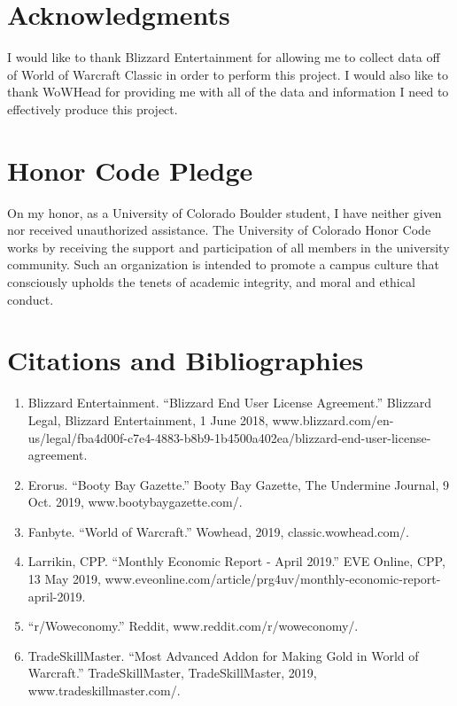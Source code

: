 \documentclass[sigconf]{acmart}
\begin{document}
\section{Acknowledgments}
I would like to thank Blizzard Entertainment for allowing me to collect data off of World of Warcraft Classic in order to perform this project. I would also like to thank WoWHead for providing me with all of the data and information I need to effectively produce this project.

\section{Honor Code Pledge}
On my honor, as a University of Colorado Boulder student, I have neither given nor received unauthorized assistance. The University of Colorado Honor Code works by receiving the support and participation of all members in the university community. Such an organization is intended to promote a campus culture that consciously upholds the tenets of academic integrity, and moral and ethical conduct.

\section{Citations and Bibliographies}
\begin{enumerate}
	\item Blizzard Entertainment. “Blizzard End User License Agreement.” Blizzard Legal, Blizzard Entertainment, 1 June 2018, www.blizzard.com/en-us/legal/fba4d00f-c7e4-4883-b8b9-1b4500a402ea/blizzard-end-user-license-agreement.
	\item Erorus. “Booty Bay Gazette.” Booty Bay Gazette, The Undermine Journal, 9 Oct. 2019, www.bootybaygazette.com/.
	\item Fanbyte. “World of Warcraft.” Wowhead, 2019, classic.wowhead.com/.
	\item Larrikin, CPP. “Monthly Economic Report - April 2019.” EVE Online, CPP, 13 May 2019, www.eveonline.com/article/prg4uv/monthly-economic-report-april-2019.
	\item “r/Woweconomy.” Reddit, www.reddit.com/r/woweconomy/.
	\item TradeSkillMaster. “Most Advanced Addon for Making Gold in World of Warcraft.” TradeSkillMaster, TradeSkillMaster, 2019, www.tradeskillmaster.com/.
\end{enumerate}
\end{document}
